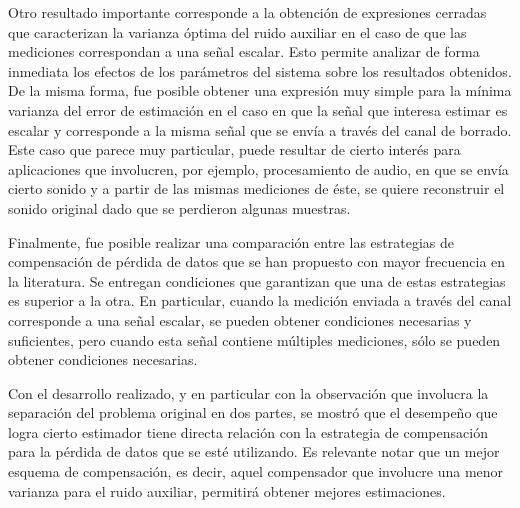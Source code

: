 Otro resultado importante corresponde a la obtenci\'on de expresiones cerradas que caracterizan la varianza \'optima del ruido auxiliar en el caso de que las mediciones correspondan a una se\~nal escalar. Esto permite analizar de forma inmediata los efectos de los par\'ametros del sistema sobre los resultados obtenidos. De la misma forma, fue posible obtener una expresi\'on muy simple para la m\'inima varianza del error de estimaci\'on en el caso en que la se\~nal que interesa estimar es escalar y corresponde a la misma se\~nal que se env\'ia a trav\'es del canal de borrado. Este caso que parece muy particular, puede resultar de cierto inter\'es para aplicaciones que involucren, por ejemplo, procesamiento de audio, en que se env\'ia cierto sonido y a partir de las mismas mediciones de \'este, se quiere reconstruir el sonido original dado que se perdieron algunas muestras.

Finalmente, fue posible realizar una comparaci\'on entre las estrategias de compensaci\'on de p\'erdida de datos que se han propuesto con mayor frecuencia en la literatura. Se entregan condiciones que garantizan que una de estas estrategias es superior a la otra. En particular, cuando la medici\'on enviada a trav\'es del canal corresponde a una se\~nal escalar, se pueden obtener condiciones necesarias y suficientes, pero cuando esta se\~nal contiene m\'ultiples mediciones, s\'olo se pueden obtener condiciones necesarias.

Con el desarrollo realizado, y en particular con la observaci\'on que involucra la separaci\'on del problema original en dos partes, se mostr\'o que el desempe\~no que logra cierto estimador tiene directa relaci\'on con la estrategia de compensaci\'on para la p\'erdida de datos que se est\'e utilizando. Es relevante notar que un mejor esquema de compensaci\'on, es decir, aquel compensador que involucre una menor varianza para el ruido auxiliar, permitir\'a obtener mejores estimaciones.


